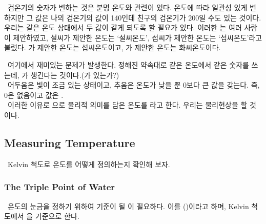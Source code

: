 \begin{sssbox}
\ 검온기의 숫자가 변하는 것은 분명 온도와 관련이 있다.
온도에 따라 일관성 있게 변하지만 그 값은 
나의 검온기의 값이 140인데 친구의 검온기가 200일 수도 있는 것이다.
우리는 같은 온도 상태에서 두 값이 같게 되도록 할 필요가 있다.
이러한 는 여러 사람이 제안하였고,
설씨가 제안한 온도는 `설씨온도', 섭씨가 제안한 온도는 `섭씨온도'라고 불렀다.
가 제안한 온도는 섭씨온도이고,
가 제안한 온도는 화씨온도이다. \\
%

\ 여기에서 재미있는 문제가 발생한다. 정해진 약속대로 같은 온도에서 같은 숫자를 쓰는데,
가 생긴다는 것이다.(가 있는가?) \\

\ 어두움은 빛이 조금 있는 상태이고, 추움은 온도가 낮을 뿐 0보다 큰 값을 갖는다.
즉, 0은 없음이고 값은 . \\

\ 이러한 이유로 으로 물리적 의미를 담은 온도를
라고 한다.
우리는 물리현상을 할 것이다.
\end{sssbox}

\subsection{Measuring Temperature}
%
\ Kelvin 척도로 온도를 어떻게 정의하는지 확인해 보자.

\subsubsection{The Triple Point of Water}
%
\ 온도의 눈금을 정하기 위하여 기준이 될 이 필요하다.
이를 ()이라고 하며,
Kelvin 척도에서 을 기준으로 한다.\\
%

